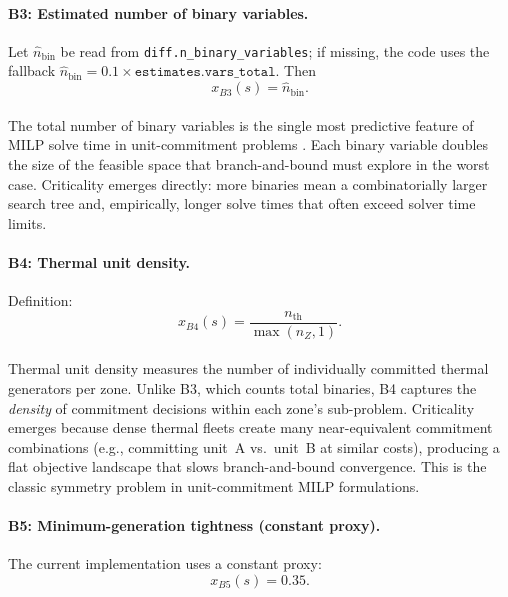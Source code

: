 \documentclass{article}
\let\parencite\citep
\begin{document}
\paragraph{B3: Estimated number of binary variables.}
Let $\widehat{n}_{\mathrm{bin}}$ be read from \texttt{diff.n\_binary\_variables}; if missing, the code uses the fallback
$\widehat{n}_{\mathrm{bin}}=0.1\times\texttt{estimates.vars\_total}$. Then
\begin{equation}
x_{B3}(s)=\widehat{n}_{\mathrm{bin}}.
\end{equation}

\paragraph{}The total number of binary variables is the single most predictive feature of MILP solve time in unit-commitment problems \parencite{morales_espana_tight_2013}. Each binary variable doubles the size of the feasible space that branch-and-bound must explore in the worst case. Criticality emerges directly: more binaries mean a combinatorially larger search tree and, empirically, longer solve times that often exceed solver time limits.

\paragraph{B4: Thermal unit density.}
Definition:
\begin{equation}
x_{B4}(s)=\frac{n_{\mathrm{th}}}{\max(n_Z,1)}.
\end{equation}

\paragraph{}Thermal unit density measures the number of individually committed thermal generators per zone. Unlike B3, which counts total binaries, B4 captures the \emph{density} of commitment decisions within each zone's sub-problem. Criticality emerges because dense thermal fleets create many near-equivalent commitment combinations (e.g., committing unit~A vs.\ unit~B at similar costs), producing a flat objective landscape that slows branch-and-bound convergence. This is the classic symmetry problem in unit-commitment MILP formulations.

\paragraph{B5: Minimum-generation tightness (constant proxy).}
The current implementation uses a constant proxy:
\begin{equation}
x_{B5}(s)=0.35.
\end{equation}
\end{document}
